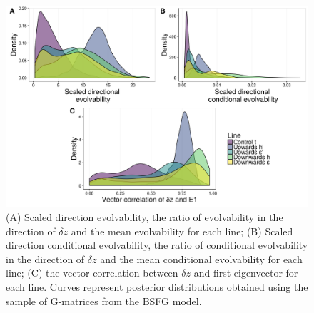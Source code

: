 \begin{refsection}
\begin{figure}
\centering
\includegraphics[width = 12cm]{chapter_ratones/media/SI/figureS10_Fig4Gversion.png}
\caption{(A) Scaled direction evolvability, the ratio of evolvability in the direction of $\delta z$ and the mean evolvability for each line; (B) Scaled direction conditional evolvability, the ratio of conditional evolvability in the direction of $\delta z$ and the mean conditional evolvability for each line; (C) the vector correlation between $\delta z$ and first eigenvector for each line. Curves represent posterior distributions obtained using the sample of G-matrices from the BSFG model.}
\end{figure}

\end{refsection}

